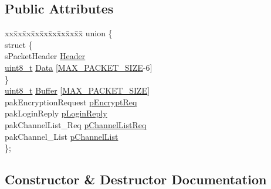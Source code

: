 \subsection*{Public Attributes}
\begin{DoxyCompactItemize}
\item 
\begin{tabbing}
xx\=xx\=xx\=xx\=xx\=xx\=xx\=xx\=xx\=\kill
union \{\\
\>struct \{\\
\>\>sPacketHeader \hyperlink{structCRosePacket_a5fd55d9dc0a08df2a51f06399938bf20}{Header}\\
\>\>\hyperlink{stdint_8h_aba7bc1797add20fe3efdf37ced1182c5}{uint8\_t} \hyperlink{structCRosePacket_a017bcafca6d8682305d19ab0033e5eb9}{Data} \mbox{[}\hyperlink{ePacketType_8h_a879456c3b8e2853f7044d764e9c180d4}{MAX\_PACKET\_SIZE}-\/6\mbox{]}\\
\>\} \\
\>\hyperlink{stdint_8h_aba7bc1797add20fe3efdf37ced1182c5}{uint8\_t} \hyperlink{structCRosePacket_ad2dda368356018e664b7882d5a8993b5}{Buffer} \mbox{[}\hyperlink{ePacketType_8h_a879456c3b8e2853f7044d764e9c180d4}{MAX\_PACKET\_SIZE}\mbox{]}\\
\>pakEncryptionRequest \hyperlink{structCRosePacket_a962aba85cb1c1b25e892e5998d31e001}{pEncryptReq}\\
\>pakLoginReply \hyperlink{structCRosePacket_aa000a7926ffde2c71a415d2923f4f3b1}{pLoginReply}\\
\>pakChannelList\_Req \hyperlink{structCRosePacket_a1365464fce4f8eb2792c06a7ab76c607}{pChannelListReq}\\
\>pakChannel\_List \hyperlink{structCRosePacket_ab46e55f876dd5e2e70b30b1308062401}{pChannelList}\\
\}; \\

\end{tabbing}\end{DoxyCompactItemize}


\subsection{Constructor \& Destructor Documentation}
